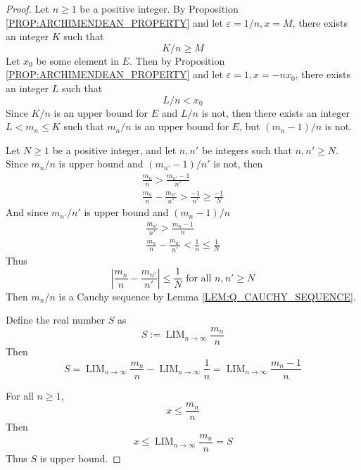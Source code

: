 \documentclass{blog}
\DeclareMathOperator{\LIM}{LIM}
\begin{document}
\begin{proof}
  Let $n \geq 1$ be a positive integer.
  By Proposition \ref{PROP:ARCHIMENDEAN_PROPERTY} and
  let $\varepsilon = 1 / n, x = M$,
  there exists an integer $K$ such that
  \begin{equation*}
    K / n \geq M
  \end{equation*}
  Let $x_{0}$ be some element in $E$.
  Then by Proposition \ref{PROP:ARCHIMENDEAN_PROPERTY} and
  let $\varepsilon = 1, x = -n x_{0}$,
  there exists an integer $L$ such that
  \begin{equation*}
    L / n < x_{0}
  \end{equation*}
  Since $K / n$ is an upper bound for $E$ and $L / n$ is not,
  then there exists an integer
  $L < m_{n} \leq K$ such that $m_{n} / n$ is an upper bound for $E$,
  but $(m_{n} - 1) / n$ is not.

  Let $N \geq 1$ be a positive integer,
  and let $n, n'$ be integers such that $n, n' \geq N$.
  Since $m_{n} / n$ is upper bound and $(m_{n'} - 1) / n'$ is not, then
  \begin{gather*}
    \frac{m_{n}}{n} > \frac{m_{n'} - 1}{n'} \\
    \frac{m_{n}}{n} - \frac{m_{n'}}{n'} > \frac{-1}{n'} \geq \frac{-1}{N}
  \end{gather*}
  And since $m_{n'} / n'$ is upper bound and $(m_{n} - 1) / n$
  \begin{gather*}
    \frac{m_{n'}}{n'} > \frac{m_{n} - 1}{n} \\
    \frac{m_{n}}{n} - \frac{m_{n'}}{n'} < \frac{1}{n} \leq \frac{1}{N}
  \end{gather*}
  Thus
  \begin{equation*}
    \left| \frac{m_{n}}{n} - \frac{m_{n'}}{n'} \right| \leq \frac{1}{N}
    \text{ for all } n, n' \geq N
  \end{equation*}
  Then $m_{n} / n$ is a Cauchy sequence by Lemma \ref{LEM:Q_CAUCHY_SEQUENCE}.

  Define the real number $S$ as
  \begin{equation*}
    S := \LIM_{n \to \infty} \frac{m_{n}}{n}
  \end{equation*}
  Then
  \begin{equation*}
    S = \LIM_{n \to \infty} \frac{m_{n}}{n} - \LIM_{n \to \infty} \frac{1}{n}
    = \LIM_{n \to \infty} \frac{m_{n} - 1}{n}
  \end{equation*}

  For all $n \geq 1$,
  \begin{equation*}
    x \leq \frac{m_{n}}{n}
  \end{equation*}
  Then
  \begin{equation*}
    x \leq \LIM_{n \to \infty} \frac{m_{n}}{n} = S
  \end{equation*}
  Thus $S$ is upper bound.


\end{proof}
\end{document}
